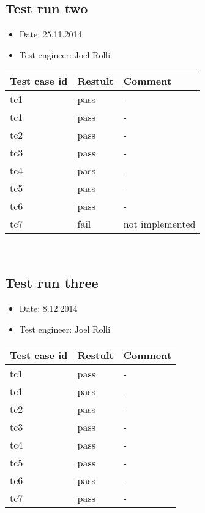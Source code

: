 	\subsection{Test run two}

	\begin{itemize}
	\item Date: 25.11.2014
	\item Test engineer: Joel Rolli 
	\end{itemize}	


	\begin{tabular}{ | p{3cm} | p{2cm} | p{3cm} |}
	\hline
	\textbf{Test case id} 					& \textbf{Restult} & \textbf{Comment} 		\\ 	\hline
	tc1 & pass & - \\ \hline	
	tc1 & pass & - \\ \hline	
	tc2 & pass & - \\ \hline	
	tc3 & pass & - \\ \hline	
	tc4 & pass & - \\ \hline	
	tc5 & pass & - \\ \hline	
	tc6 & pass & - \\ \hline	
	tc7 & fail & not implemented \\ \hline	
	\end{tabular} \\


		\subsection{Test run three}

	\begin{itemize}
	\item Date: 8.12.2014
	\item Test engineer: Joel Rolli 
	\end{itemize}	


	\begin{tabular}{ | p{3cm} | p{3cm} | p{3cm} |}
	\hline
	\textbf{Test case id} 					& \textbf{Restult} & \textbf{Comment} 		\\ 	\hline
	tc1 & pass & - \\ \hline	
	tc1 & pass & - \\ \hline	
	tc2 & pass & - \\ \hline	
	tc3 & pass & - \\ \hline	
	tc4 & pass & - \\ \hline	
	tc5 & pass & - \\ \hline	
	tc6 & pass & - \\ \hline	
	tc7 & pass & - \\ \hline	
	\end{tabular} \\